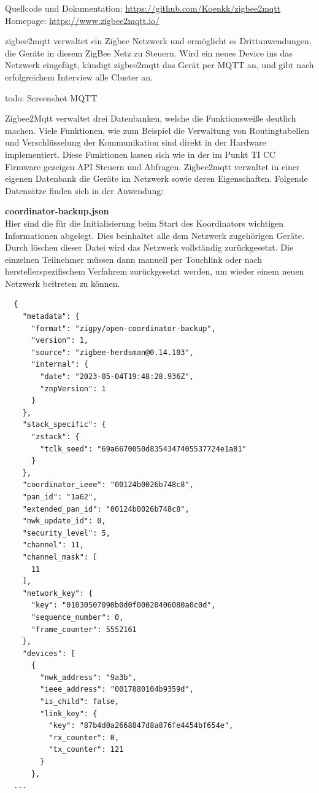 Quellcode und Dokumentation: \url{https://github.com/Koenkk/zigbee2mqtt}
Homepage: \url{https://www.zigbee2mqtt.io/}

\grqq zigbee2mqtt\grqq{} verwaltet ein Zigbee Netzwerk und ermöglicht es Drittanwendungen, die Geräte in diesem ZigBee Netz zu Steuern. Wird ein neues Device ins das Netzwerk eingefügt,
kündigt zigbee2mqtt das Gerät per MQTT an, und gibt nach erfolgreichem Interview alle Cluster an.

todo: Screenshot MQTT

Zigbee2Mqtt verwaltet drei Datenbanken, welche die Funktionsweiße deutlich machen. Viele Funktionen, wie zum Beispiel die Verwaltung von Routingtabellen und
Verschlüsselung der Kommunikation sind direkt in der Hardware implementiert. Diese Funktionen lassen sich wie in der im Punkt TI CC Firmware gezeigen API Steuern und Abfragen.
Zigbee2mqtt verwaltet in einer eigenen Datenbank die Geräte im Netzwerk sowie deren Eigenschaften.
Folgende Datensätze finden sich in der Anwendung:

\textbf{coordinator-backup.json}\\

Hier sind die für die Initialisierung beim Start des Koordinators wichtigen Informationen abgelegt. Dies beinhaltet alle dem Netzwerk zugehörigen Geräte.
Durch löschen dieser Datei wird das Netzwerk vollständig zurückgesetzt. Die einzelnen Teilnehmer müssen dann manuell per Touchlink oder nach herstellerspezifischem Verfahrem
zurückgesetzt werden, um wieder einem neuen Netzwerk beitreten zu können.


\begin{lstlisting}
  {
    "metadata": {
      "format": "zigpy/open-coordinator-backup",
      "version": 1,
      "source": "zigbee-herdsman@0.14.103",
      "internal": {
        "date": "2023-05-04T19:48:28.936Z",
        "znpVersion": 1
      }
    },
    "stack_specific": {
      "zstack": {
        "tclk_seed": "69a6670050d8354347405537724e1a81"
      }
    },
    "coordinator_ieee": "00124b0026b748c8",
    "pan_id": "1a62",
    "extended_pan_id": "00124b0026b748c8",
    "nwk_update_id": 0,
    "security_level": 5,
    "channel": 11,
    "channel_mask": [
      11
    ],
    "network_key": {
      "key": "01030507090b0d0f00020406080a0c0d",
      "sequence_number": 0,
      "frame_counter": 5552161
    },
    "devices": [
      {
        "nwk_address": "9a3b",
        "ieee_address": "0017880104b9359d",
        "is_child": false,
        "link_key": {
          "key": "87b4d0a2668847d8a876fe4454bf654e",
          "rx_counter": 0,
          "tx_counter": 121
        }
      },
  ...  
  \end{lstlisting}

